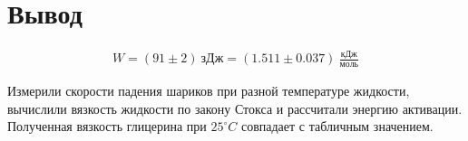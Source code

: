 \documentclass[a4paper, 12pt]{article}
\begin{document}
    \section{Вывод}

    \begin{align*}
        W = (91 \pm 2)~зДж = (1.511 \pm 0.037)~\frac{кДж}{моль}
    \end{align*}

    Измерили скорости падения шариков при разной температуре жидкости, вычислили вязкость жидкости по закону Стокса и рассчитали энергию активации. Полученная вязкость глицерина при $25^\circ C$ совпадает с табличным значением.
\end{document}
